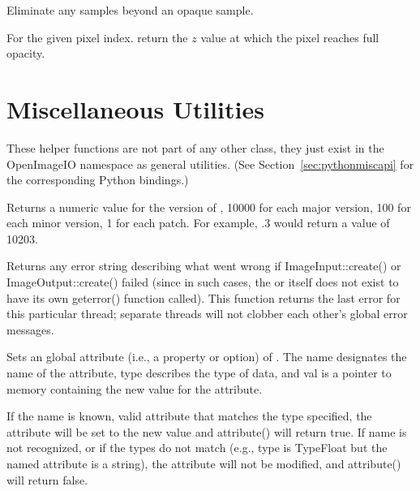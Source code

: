 Eliminate any samples beyond an opaque sample.
\apiend

For the given pixel index. return the $z$ value at which the pixel reaches
full opacity.
\apiend


\section{Miscellaneous Utilities}
\label{sec:miscapi}

These helper functions are not part of any other \OpenImageIO class,
they just exist in the {\cf OpenImageIO} namespace as general utilities.
(See Section~\ref{sec:pythonmiscapi} for the corresponding Python
bindings.)

Returns a numeric value for the version of \product, 10000 for each
major version, 100 for each minor version, 1 for each patch.  For
example, .3 would return a value of 10203.
\apiend

Returns any error string describing what went wrong if 
{\cf ImageInput::create()} or \\ {\cf ImageOutput::create()} failed
(since in such cases, the \ImageInput or \ImageOutput itself does 
not exist to have its own {\cf geterror()} function called).
This function returns the last error
for this particular thread; separate threads will not clobber each
other's global error messages.
\apiend


\label{sec:globalattribute}

Sets an global attribute (i.e., a property or option) of \product.
The {\cf name} designates the name of the attribute, {\cf type}
describes the type of data, and {\cf val} is a pointer to memory 
containing the new value for the attribute.

If the name is known, valid attribute that matches the type specified,
the attribute will be set to the new value and {\cf attribute()} will
return {\cf true}.  If {\cf name} is not recognized, or if the types do
not match (e.g., {\cf type} is {\cf TypeFloat} but the named
attribute is a string), the attribute will not be modified, and {\cf
  attribute()} will return {\cf false}.

